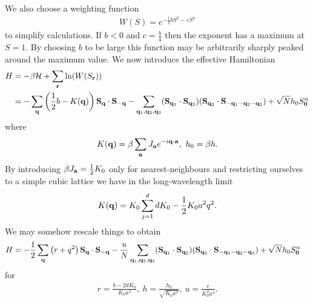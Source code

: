 We also choose a weighting function
\begin{align*}
	W(S) = e^{-\frac{1}{2}bS^{2} - cS^{4}}
\end{align*}
to simplify calculations. If $b < 0$  and $c = \frac{b}{4}$ then the exponent has a maximum at $S = 1$. By choosing $b$ to be large this function may be arbitrarily sharply peaked around the maximum value. We now introduce the effective Hamiltonian
\begin{align*}
	H &= -\beta\mathcal{H} + \sum\limits_{\vb{r}}\ln(W(S_{\vb{r}})) \\
	  &= -\sum\limits_{\vb{q}}\left(\frac{1}{2}b - K(\vb{q})\right)\vb{S}_{\vb{q}}\cdot\vb{S}_{-\vb{q}} - \sum\limits_{\vb{q}_{1}, \vb{q}_{2}, \vb{q}_{3}}(\vb{S}_{\vb{q}_{1}}\cdot\vb{S}_{\vb{q}_{2}})(\vb{S}_{\vb{q}_{3}}\cdot\vb{S}_{-\vb{q}_{1} - \vb{q}_{2} - \vb{q}_{3}}) + \sqrt{N}h_{0}S_{\vb{0}}^{\alpha}
\end{align*}
where
\begin{align*}
	K(\vb{q}) = \beta\sum\limits_{\vb{a}}J_{\vb{a}}e^{-i\vb{q}\cdot\vb{a}},\ h_{0} = \beta h.
\end{align*}
By introducing $\beta J_{\vb{a}} = \frac{1}{2}K_{0}$ only for nearest-neighbours and restricting ourselves to a simple cubic lattice we have in the long-wavelength limit
\begin{align*}
	K(\vb{q}) = K_{0}\sum\limits_{j = 1}^{d}dK_{0} - \frac{1}{2}K_{0}a^{2}q^{2}.
\end{align*}
We may somehow rescale things to obtain
\begin{align*}
	H &= -\frac{1}{2}\sum\limits_{\vb{q}}\left(r + q^{2}\right)\vb{S}_{\vb{q}}\cdot\vb{S}_{-\vb{q}} - \frac{u}{N}\sum\limits_{\vb{q}_{1}, \vb{q}_{2}, \vb{q}_{3}}(\vb{S}_{\vb{q}_{1}}\cdot\vb{S}_{\vb{q}_{2}})(\vb{S}_{\vb{q}_{3}}\cdot\vb{S}_{-\vb{q}_{1} - \vb{q}_{2} - \vb{q}_{3}}) + \sqrt{N}h_{0}S_{\vb{0}}^{\alpha}
\end{align*}
for
\begin{align*}
	r = \frac{b - 2dK_{0}}{K_{0}a^{2}},\ h = \frac{h_{0}}{\sqrt{K_{0}a^{2}}},\ u = \frac{c}{K_{0}^{2}a^{4}}.
\end{align*}

